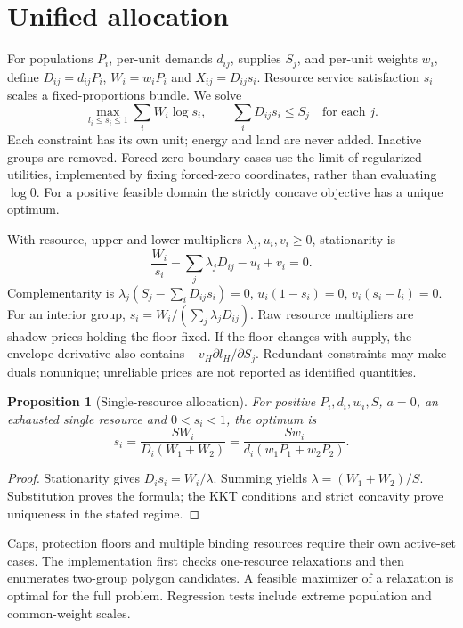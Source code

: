 \documentclass[11pt]{article}
\newtheorem{proposition}{Proposition}
\begin{document}
\section{Unified allocation}
For populations $P_i$, per-unit demands $d_{ij}$, supplies $S_j$, and per-unit
weights $w_i$, define $D_{ij}=d_{ij}P_i$, $W_i=w_iP_i$ and $X_{ij}=D_{ij}s_i$.
Resource service satisfaction $s_i$ scales a fixed-proportions bundle. We solve
\begin{equation}
\max_{l_i\le s_i\le1}\sum_i W_i\log s_i,
\qquad \sum_iD_{ij}s_i\le S_j\quad\text{for each }j.\label{eq:allocation}
\end{equation}
Each constraint has its own unit; energy and land are never added. Inactive groups
are removed. Forced-zero boundary cases use the limit of regularized utilities,
implemented by fixing forced-zero coordinates, rather than evaluating $\log0$.
For a positive feasible domain the strictly concave objective has a unique optimum.

With resource, upper and lower multipliers $\lambda_j,u_i,v_i\ge0$, stationarity is
\begin{equation}
\frac{W_i}{s_i}-\sum_j\lambda_jD_{ij}-u_i+v_i=0.
\end{equation}
Complementarity is $\lambda_j(S_j-\sum_iD_{ij}s_i)=0$,
$u_i(1-s_i)=0$, $v_i(s_i-l_i)=0$. For an interior group,
$s_i=W_i/(\sum_j\lambda_jD_{ij})$. Raw resource multipliers are shadow prices
holding the floor fixed. If the floor changes with supply, the envelope derivative
also contains $-v_H\partial l_H/\partial S_j$. Redundant constraints may make duals
nonunique; unreliable prices are not reported as identified quantities.

\begin{proposition}[Single-resource allocation]
For positive $P_i,d_i,w_i,S$, $a=0$, an exhausted single resource and
$0<s_i<1$, the optimum is
\begin{equation}
s_i=\frac{SW_i}{D_i(W_1+W_2)}
=\frac{Sw_i}{d_i(w_1P_1+w_2P_2)}.\label{eq:single}
\end{equation}
\end{proposition}
\begin{proof}
Stationarity gives $D_is_i=W_i/\lambda$. Summing yields
$\lambda=(W_1+W_2)/S$. Substitution proves the formula; the KKT conditions
and strict concavity prove uniqueness in the stated regime.
\end{proof}
Caps, protection floors and multiple binding resources require their own active-set
cases. The implementation first checks one-resource relaxations and then enumerates
two-group polygon candidates. A feasible maximizer of a relaxation is optimal for the
full problem. Regression tests include extreme population and common-weight scales.
\end{document}
